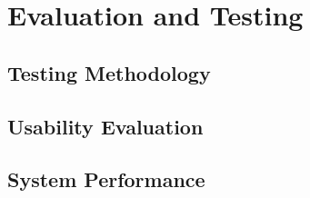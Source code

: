 \chapter{Evaluation and Testing}
\section{Testing Methodology}
\section{Usability Evaluation}
\section{System Performance}
